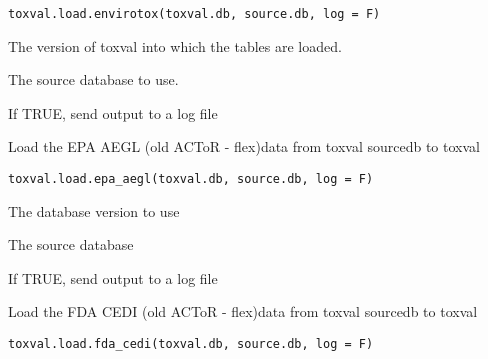 \documentclass[letterpaper]{book}
\begin{document}
%
\begin{Usage}
\begin{verbatim}
toxval.load.envirotox(toxval.db, source.db, log = F)
\end{verbatim}
\end{Usage}
%
\begin{Arguments}
\begin{ldescription}
\item[\code{toxval.db}] The version of toxval into which the tables are loaded.

\item[\code{source.db}] The source database to use.

\item[\code{log}] If TRUE, send output to a log file
\end{ldescription}
\end{Arguments}
%
\begin{Description}\relax
Load the EPA AEGL (old ACToR - flex)data  from toxval sourcedb to toxval
\end{Description}
%
\begin{Usage}
\begin{verbatim}
toxval.load.epa_aegl(toxval.db, source.db, log = F)
\end{verbatim}
\end{Usage}
%
\begin{Arguments}
\begin{ldescription}
\item[\code{toxval.db}] The database version to use

\item[\code{source.db}] The source database

\item[\code{log}] If TRUE, send output to a log file
\end{ldescription}
\end{Arguments}
%
\begin{Description}\relax
Load the FDA CEDI (old ACToR - flex)data  from toxval sourcedb to toxval
\end{Description}
%
\begin{Usage}
\begin{verbatim}
toxval.load.fda_cedi(toxval.db, source.db, log = F)
\end{verbatim}
\end{Usage}
\end{document}
